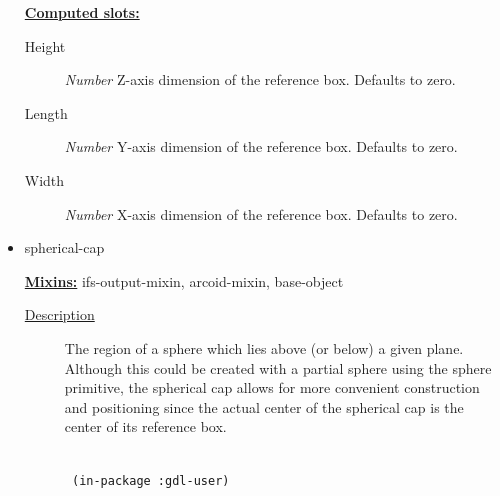\documentclass [11pt]{book}
\begin{document}
\begin{itemize}
\begin{description}
\end{description}






\textbf{
\underline{Computed slots:}}

\begin{description}

\item [Height]
\emph{Number} Z-axis dimension of the reference box. Defaults to zero.


\item [Length]
\emph{Number} Y-axis dimension of the reference box. Defaults to zero.


\item [Width]
\emph{Number} X-axis dimension of the reference box. Defaults to zero.


\end{description}







\item {}spherical-cap


\textbf{
\underline{Mixins:}} ifs-output-mixin, arcoid-mixin, base-object





\begin{description}

\item [
\underline{Description}]


The region of a sphere which lies above (or below) a given plane. Although this
could be created with a partial sphere using the sphere primitive, the spherical cap allows for more convenient
construction and positioning since the actual center of the spherical cap is the center of its reference box.



\end{description}




\begin{figure}
\begin{lrbox}{\boxedverb}
\begin{minipage}{\linewidth}
{\small

\begin{verbatim}
  
 (in-package :gdl-user)


\end{verbatim}}
\end{minipage}
\end{lrbox}
\end{figure}
\end{itemize}
\end{document}
